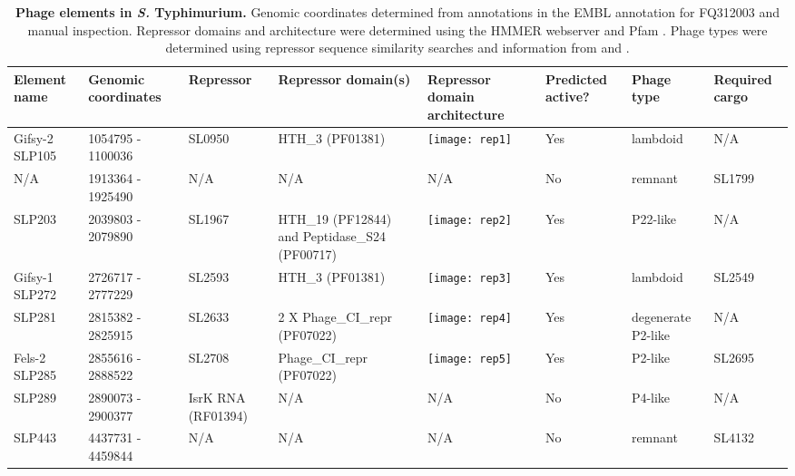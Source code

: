 %
\begin{table}
   \tiny
   \centering
   \noindent
    \caption[Phage elements in \textit{S.} Typhimurium]{\textbf{Phage elements in \emph{S.} Typhimurium.} Genomic coordinates determined from annotations in the EMBL annotation for FQ312003 and manual inspection. Repressor domains and architecture were determined using the HMMER webserver \parencite{Finn2011} and Pfam \parencite{Punta2012}. Phage types were determined using repressor sequence similarity searches and information from \textcite{Thomson2004} and \textcite{Kropinski2007}. }
    \begin{tabular}{     m{0.5in}
    				m{0.4in}
				m{0.4in}
				m{0.6in}
				m{1.6in}
				m{0.4in}
				m{0.5in}
				m{0.5in}
				}
   
    \\
     \toprule
    \textbf{Element name} & \textbf{Genomic coordinates} & \textbf{Repressor} & \textbf{Repressor domain(s)} & \textbf{Repressor domain architecture} & \textbf{Predicted active?} & \textbf{Phage type} & \textbf{Required cargo} \\
    \midrule
    Gifsy-2 SLP105 & 1054795 - 1100036 & SL0950 & HTH\_3 (PF01381) &\texttt{[image: rep1]}& Yes   & lambdoid & N/A \\
    N/A   & 1913364 - 1925490 & N/A   & N/A   & N/A   & No    & remnant & SL1799 \\
    SLP203 & 2039803 - 2079890 & SL1967 & HTH\_19 (PF12844) and Peptidase\_S24 (PF00717) &\texttt{[image: rep2]}& Yes   & P22-like & N/A \\
    Gifsy-1 SLP272 & 2726717 - 2777229 & SL2593 & HTH\_3 (PF01381) &    \texttt{[image: rep3]}   & Yes   & lambdoid & SL2549 \\
    SLP281 & 2815382 - 2825915 & SL2633 & 2 X Phage\_CI\_repr (PF07022) &   \texttt{[image: rep4]}    & Yes   & degenerate P2-like & N/A \\
    Fels-2 SLP285 & 2855616 - 2888522 & SL2708 & Phage\_CI\_repr (PF07022) &   \texttt{[image: rep5]}    & Yes   & P2-like & SL2695 \\
    SLP289 & 2890073 - 2900377 & IsrK RNA (RF01394) & N/A   & N/A   & No    & P4-like & N/A \\
    SLP443 & 4437731 - 4459844 & N/A   & N/A   & N/A   & No    & remnant & SL4132 \\
    \bottomrule    
    \end{tabular}%
    \label{tab:stm_phage}%
\end{table}

